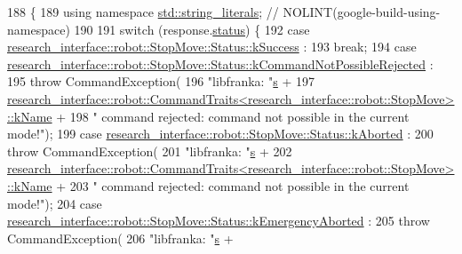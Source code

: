 \begin{DoxyCode}
188                                                                    \{
189   \textcolor{keyword}{using namespace }\hyperlink{namespacestd_1_1string__literals}{std::string\_literals};  \textcolor{comment}{// NOLINT(google-build-using-namespace)}
190 
191   \textcolor{keywordflow}{switch} (response.\hyperlink{structresearch__interface_1_1robot_1_1ResponseBase_a99bb821172a0ac77338cd8e0acbe8a96}{status}) \{
192     \textcolor{keywordflow}{case} \hyperlink{structresearch__interface_1_1robot_1_1StopMove_a74b1999fa778670f312087dd9acf231da8c632159fa131f09d04f94e3cbcd8782}{research\_interface::robot::StopMove::Status::kSuccess}
      :
193       \textcolor{keywordflow}{break};
194     \textcolor{keywordflow}{case} 
      \hyperlink{structresearch__interface_1_1robot_1_1StopMove_a74b1999fa778670f312087dd9acf231da168d00b46403240019d0b42f5a116cdd}{research\_interface::robot::StopMove::Status::kCommandNotPossibleRejected}
      :
195       \textcolor{keywordflow}{throw} CommandException(
196           \textcolor{stringliteral}{"libfranka: "}\hyperlink{namespaceservice__node__3_aa976421a49e0b54f23833423400849ae}{s} +
197           
      \hyperlink{structresearch__interface_1_1robot_1_1CommandTraits}{research\_interface::robot::CommandTraits<research\_interface::robot::StopMove>::kName}
       +
198           \textcolor{stringliteral}{" command rejected: command not possible in the current mode!"});
199     \textcolor{keywordflow}{case} \hyperlink{structresearch__interface_1_1robot_1_1StopMove_a74b1999fa778670f312087dd9acf231dac20d0424ae4484fda4424713f021d736}{research\_interface::robot::StopMove::Status::kAborted}
      :
200       \textcolor{keywordflow}{throw} CommandException(
201           \textcolor{stringliteral}{"libfranka: "}\hyperlink{namespaceservice__node__3_aa976421a49e0b54f23833423400849ae}{s} +
202           
      \hyperlink{structresearch__interface_1_1robot_1_1CommandTraits}{research\_interface::robot::CommandTraits<research\_interface::robot::StopMove>::kName}
       +
203           \textcolor{stringliteral}{" command rejected: command not possible in the current mode!"});
204     \textcolor{keywordflow}{case} \hyperlink{structresearch__interface_1_1robot_1_1StopMove_a74b1999fa778670f312087dd9acf231da452811dc518f62ba40861befb68a20cf}{research\_interface::robot::StopMove::Status::kEmergencyAborted}
      :
205       \textcolor{keywordflow}{throw} CommandException(
206           \textcolor{stringliteral}{"libfranka: "}\hyperlink{namespaceservice__node__3_aa976421a49e0b54f23833423400849ae}{s} +

\end{DoxyCode}
